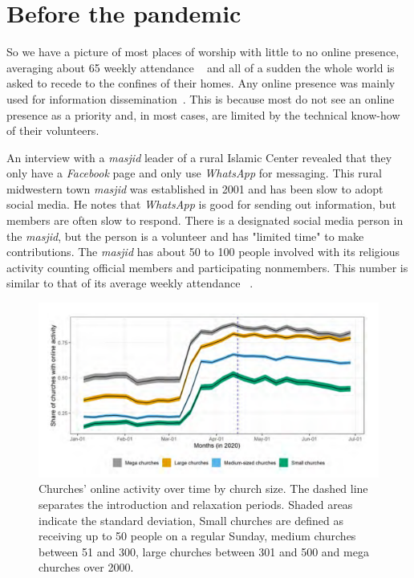 \section{Before the pandemic}
So we have a picture of most places of worship with little to no online presence, averaging about 65 weekly attendance ~\cite{yonat:shimron} and all of a sudden the whole world is asked to recede to the confines of their homes. Any online presence was mainly used for information dissemination~\cite{helland}. This is because most do not see an online presence as a priority and, in most cases, are limited by the technical know-how of their volunteers. 

An interview with a \textit{masjid} leader of a rural Islamic Center revealed that they only have a \textit{Facebook} page and only use \textit{WhatsApp} for messaging. This rural midwestern town \textit{masjid} was established in 2001 and has been slow to adopt social media. He notes that \textit{WhatsApp} is good for sending out information, but members are often slow to respond. There is a designated social media person in the \textit{masjid}, but the person is a volunteer and has "limited time" to make contributions. The \textit{masjid} has about 50 to 100 people involved with its religious activity counting official members and participating nonmembers. This number is similar to that of its average weekly attendance ~\cite{grant2019religion}. 

\begin{figure}[t!]
\centering
\includegraphics[width=\columnwidth]{images/fig_6.PNG}
\caption{Churches' online activity over time by church size. The dashed line separates the introduction and relaxation periods. Shaded areas indicate the standard deviation, Small churches are defined as receiving up to 50 people on a regular Sunday,
medium churches between 51 and 300, large churches between 301 and 500 and mega churches over 2000.}
\label{fig1}
\end{figure}

